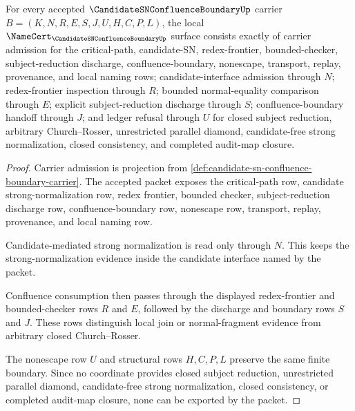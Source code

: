 \begin{theorem}
\label{thm:candidate-sn-confluence-boundary-namecert-obligations}
For every accepted $\CandidateSNConfluenceBoundaryUp$ carrier $B=(K,N,R,E,S,J,U,H,C,P,L)$, the local $\NameCert_{\CandidateSNConfluenceBoundaryUp}$ surface consists exactly of carrier admission for the critical-path, candidate-SN, redex-frontier, bounded-checker, subject-reduction discharge, confluence-boundary, nonescape, transport, replay, provenance, and local naming rows; candidate-interface admission through $N$; redex-frontier inspection through $R$; bounded normal-equality comparison through $E$; explicit subject-reduction discharge through $S$; confluence-boundary handoff through $J$; and ledger refusal through $U$ for closed subject reduction, arbitrary Church--Rosser, unrestricted parallel diamond, candidate-free strong normalization, closed consistency, and completed audit-map closure.
\end{theorem}
\begin{proof}
Carrier admission is projection from \autoref{def:candidate-sn-confluence-boundary-carrier}. The accepted packet exposes the critical-path row, candidate strong-normalization row, redex frontier, bounded checker, subject-reduction discharge row, confluence-boundary row, nonescape row, transport, replay, provenance, and local naming row.

Candidate-mediated strong normalization is read only through $N$. This keeps the strong-normalization evidence inside the candidate interface named by the packet.

Confluence consumption then passes through the displayed redex-frontier and bounded-checker rows $R$ and $E$, followed by the discharge and boundary rows $S$ and $J$. These rows distinguish local join or normal-fragment evidence from arbitrary closed Church--Rosser.

The nonescape row $U$ and structural rows $H,C,P,L$ preserve the same finite boundary. Since no coordinate provides closed subject reduction, unrestricted parallel diamond, candidate-free strong normalization, closed consistency, or completed audit-map closure, none can be exported by the packet.
\end{proof}

